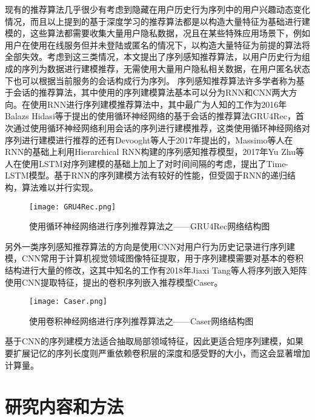 现有的推荐算法几乎很少有考虑到隐藏在用户历史行为序列中的用户兴趣动态变化情况，而且以上提到的基于深度学习的推荐算法都是以构造大量特征为基础进行建模的，这些算法都需要收集大量用户隐私数据，况且在某些特殊应用场景下，例如用户在使用在线服务但并未登陆或匿名的情况下，以构造大量特征为前提的算法将全部失效。考虑到这三类情况，本文提出了序列感知推荐算法，以用户历史行为组成的序列为数据进行建模推荐，无需使用大量用户隐私相关数据，在用户匿名状态下也可以根据当前服务的会话构成行为序列。
序列感知推荐算法许多学者称为基于会话的推荐算法，其中使用的序列建模算法基本可以分为RNN和CNN两大方向。在使用RNN进行序列建模推荐算法中，其中最广为人知的工作为2016年Balazs Hidasi等于提出的使用循环神经网络的基于会话的推荐算法GRU4Rec，首次通过使用循环神经网络利用会话的序列进行建模推荐，这类使用循环神经网络对序列进行建模进行推荐的还有Devooght等人于2017年提出的，Massimo等人在RNN的基础上利用Hierarchical RNN构建的序列感知推荐模型，2017年Yu Zhu等人在使用LSTM对序列建模的基础上加上了对时间间隔的考虑，提出了Time-LSTM模型。基于RNN的序列建模方法有较好的性能，但受固于RNN的递归结构，算法难以并行实现。
\begin{figure}[htb]
  \centering
  \texttt{[image: GRU4Rec.png]}\\
  \caption{使用循环神经网络进行序列推荐算法之——GRU4Rec网络结构图}
  \label{fig:GRU4Rec}
\end{figure}

另外一类序列感知推荐算法的方向是使用CNN对用户行为历史记录进行序列建模，CNN常用于计算机视觉领域图像特征提取，用于序列建模需要对基本的卷积结构进行大量的修改，这其中知名的工作有2018年Jiaxi Tang等人将序列嵌入矩阵使用CNN提取特征，提出的卷积序列嵌入推荐模型Caser。
\begin{figure}[htb]
  \centering
  \texttt{[image: Caser.png]}\\
  \caption{使用卷积神经网络进行序列推荐算法之——Caser网络结构图}
  \label{fig:Caser}
\end{figure}

基于CNN的序列建模方法适合抽取局部领域特征，因此更适合短序列建模，如果要扩展记忆的序列长度则严重依赖卷积层的深度和感受野的大小，而这会显著增加计算量。

\section{研究内容和方法}
